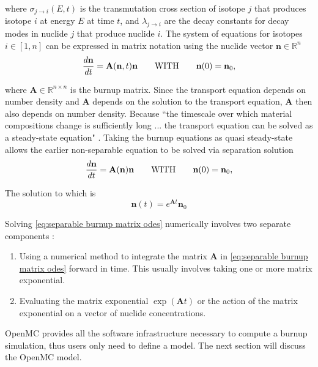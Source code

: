 \documentclass[letterpaper]{physor2024}
\begin{document}
\noindent where $\sigma_{j\rightarrow{i}}(E,t)$ is the transmutation cross section of isotope $j$ that produces isotope $i$ at energy $E$ at time $t$, and $\lambda_{j\rightarrow{i}}$ are the decay constants for decay modes in nuclide $j$ that produce nuclide $i$. The system of equations for isotopes $i\in[1,n]$ can be expressed in matrix notation using the nuclide vector $\mathbf{n}\in\mathbb{R}^{n}$
\begin{equation} \label{eq:burnup matrix odes}
    \frac{d\textbf{n}}{dt} =
    \textbf{A}(\textbf{n},t) \textbf{n}
    \qquad \text{WITH} \qquad
    \textbf{n}(0) = \textbf{n}_{0},
\end{equation}

\noindent where $\textbf{A}\in\mathbb{R}^{n\times n}$ is the burnup matrix. Since the transport equation depends on number density and $\textbf{A}$ depends on the solution to the transport equation, $\textbf{A}$ then also depends on number density. Because ``the timescale over which material compositions change is sufficiently long ... the transport equation can be solved as a steady-state equation" \cite{romano-depletion-2021}. Taking the burnup equations as quasi steady-state allows the earlier non-separable equation to be solved via separation solution
\begin{equation} \label{eq:separable burnup matrix odes}
    \frac{d\textbf{n}}{dt} =
    \textbf{A}(\textbf{n}) \textbf{n}
    \qquad \text{WITH} \qquad
    \textbf{n}(0) = \textbf{n}_{0},
\end{equation}

\noindent The solution to which is
\begin{equation} \label{eq:separation solution}
     \textbf{n}(t) = e^{\textbf{A}t} \textbf{n}_{0}
\end{equation}

\noindent Solving \cref{eq:separable burnup matrix odes} numerically involves two separate components \cite{romano-depletion-2021}:
\begin{enumerate}
    \item Using a numerical method to integrate the matrix $\textbf{A}$ in \cref{eq:separable burnup matrix odes} forward in time. This usually involves taking one or more matrix exponential.
    \item Evaluating the matrix exponential $\exp(\textbf{A}t)$ or the action of the matrix exponential on a vector of nuclide concentrations.
\end{enumerate}

OpenMC provides all the software infrastructure necessary to compute a burnup simulation, thus users only need to define a model. The next section will discuss the OpenMC model.
\end{document}
